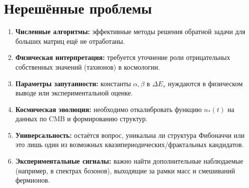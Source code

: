 \documentclass[12pt,a4paper]{article}
\begin{document}
\section{Нерешённые проблемы}
\begin{enumerate}
    \item \textbf{Численные алгоритмы:} эффективные методы решения обратной задачи для больших матриц ещё не отработаны.  
    \item \textbf{Физическая интерпретация:} требуется уточнение роли отрицательных собственных значений (тахионов) в космологии.  
    \item \textbf{Параметры запутанности:} константы $\alpha, \beta$ в $\Delta E_s$ нуждаются в физическом выводе или экспериментальной оценке.  
    \item \textbf{Космическая эволюция:} необходимо откалибровать функцию $n_*(t)$ на данных по CMB и формированию структур.  
    \item \textbf{Универсальность:} остаётся вопрос, уникальна ли структура Фибоначчи или это лишь один из возможных квазипериодических/фрактальных кандидатов.  
    \item \textbf{Экспериментальные сигналы:} важно найти дополнительные наблюдаемые (например, в спектрах бозонов), выходящие за рамки масс и смешиваний фермионов.  
\end{enumerate}
\end{document}
